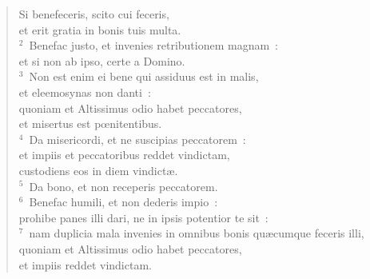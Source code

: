 \begin{flushleft}\begin{verse}\vspace{-19pt}\hspace{6pt}Si benefeceris, scito cui feceris,\\\hspace{6pt} et erit gratia in bonis tuis multa.\\
${}^{2}$~Benefac justo, et invenies retributionem magnam~:\\ et si non ab ipso, certe a Domino.\\
${}^{3}$~Non est enim ei bene qui assiduus est in malis,\\ et eleemosynas non danti~:\\ quoniam et Altissimus odio habet peccatores,\\ et misertus est pœnitentibus.\\
${}^{4}$~Da misericordi, et ne suscipias peccatorem~:\\ et impiis et peccatoribus reddet vindictam,\\ custodiens eos in diem vindict\ae .\\
${}^{5}$~Da bono, et non receperis peccatorem.\\
${}^{6}$~Benefac humili, et non dederis impio~:\\ prohibe panes illi dari, ne in ipsis potentior te sit~:\\
${}^{7}$~nam duplicia mala invenies in omnibus bonis qu\ae cumque feceris illi,\\ quoniam et Altissimus odio habet peccatores,\\ et impiis reddet vindictam.\end{verse}\end{flushleft}



